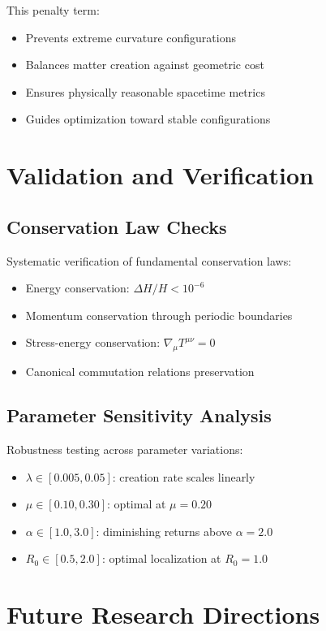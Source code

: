 \documentclass[11pt]{article}
\begin{document}
This penalty term:
\begin{itemize}
\item Prevents extreme curvature configurations
\item Balances matter creation against geometric cost
\item Ensures physically reasonable spacetime metrics
\item Guides optimization toward stable configurations
\end{itemize}

\section{Validation and Verification}

\subsection{Conservation Law Checks}

Systematic verification of fundamental conservation laws:
\begin{itemize}
\item Energy conservation: $\Delta H/H < 10^{-6}$
\item Momentum conservation through periodic boundaries
\item Stress-energy conservation: $\nabla_\mu T^{\mu\nu} = 0$
\item Canonical commutation relations preservation
\end{itemize}

\subsection{Parameter Sensitivity Analysis}

Robustness testing across parameter variations:
\begin{itemize}
\item $\lambda \in [0.005, 0.05]$: creation rate scales linearly
\item $\mu \in [0.10, 0.30]$: optimal at $\mu = 0.20$
\item $\alpha \in [1.0, 3.0]$: diminishing returns above $\alpha = 2.0$
\item $R_0 \in [0.5, 2.0]$: optimal localization at $R_0 = 1.0$
\end{itemize}

\section{Future Research Directions}
\end{document}
